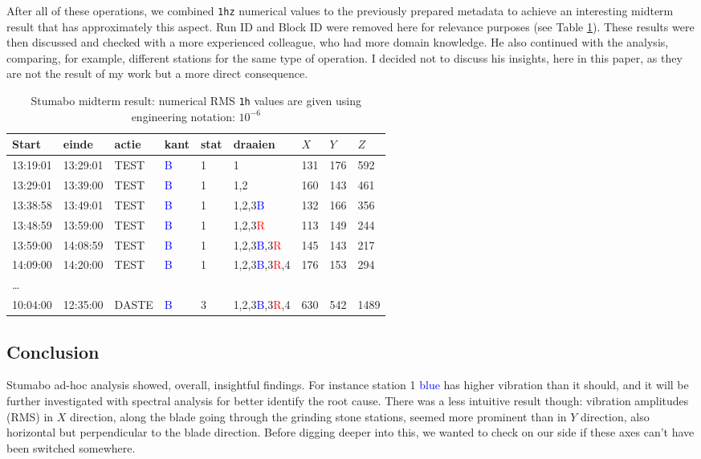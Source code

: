 After all of these operations, we combined \texttt{1hz} numerical values to the previously prepared metadata to achieve an interesting midterm result that has approximately this aspect.
Run ID and Block ID were removed here for relevance purposes (see Table \ref{tab:stu_midterm_res}).  
These results were then discussed and checked with a more experienced colleague, who had more domain knowledge. 
He also continued with the analysis, comparing, for example, different stations for the same type of operation. 
I decided not to discuss his insights, here in this paper, as they are not the result of my work but a more direct consequence.
\begin{table}[ht]
    \centering
    \begin{tabularx}{\textwidth}{@{}lllllllll@{}}
    \toprule
    Start & einde & actie & kant & stat & draaien & $X$ & $Y$ & $Z$ \\ \midrule
    13:19:01 & 13:29:01 & TEST & \textcolor{blue}{B} & 1 & 1 & 131 & 176 & 592 \\ 
    13:29:01 & 13:39:00 & TEST & \textcolor{blue}{B} & 1 & 1,2 & 160 & 143 & 461 \\  
    13:38:58 & 13:49:01 & TEST & \textcolor{blue}{B} & 1 & 1,2,3\textcolor{blue}{B} & 132 & 166 & 356 \\ 
    13:48:59 & 13:59:00 & TEST & \textcolor{blue}{B} & 1 & 1,2,3\textcolor{red}{R} & 113 & 149 & 244  \\
    13:59:00 & 14:08:59 & TEST & \textcolor{blue}{B} & 1 & 1,2,3\textcolor{blue}{B},3\textcolor{red}{R} & 145 & 143 & 217 \\ 
    14:09:00 & 14:20:00 & TEST & \textcolor{blue}{B} & 1 & 1,2,3\textcolor{blue}{B},3\textcolor{red}{R},4 & 176 & 153 & 294 \\ 
    \dots \\
    10:04:00 & 12:35:00 & DASTE & \textcolor{blue}{B} & 3 & 1,2,3\textcolor{blue}{B},3\textcolor{red}{R},4 & 630 & 542 & 1489 \\
    \bottomrule
    \end{tabularx}
    \caption{Stumabo midterm result: numerical RMS \texttt{1h} values are given using engineering notation: $10^{-6}$}
    \label{tab:stu_midterm_res}
\end{table}

\clearpage
\subsection{Conclusion}
Stumabo ad-hoc analysis showed, overall, insightful findings. For instance station 1 \textcolor{blue}{blue} has higher vibration than it should, 
and it will be further investigated with spectral analysis for better identify the root cause.
There was a less intuitive result though: vibration amplitudes (RMS) in $X$ direction, along the blade going through the grinding stone stations,
seemed more prominent than in $Y$ direction, also horizontal but perpendicular to the blade direction.
Before digging deeper into this, we wanted to check on our side if these axes can't have been switched somewhere.

